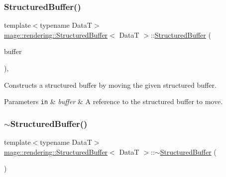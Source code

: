 \subsubsection{\texorpdfstring{Structured\+Buffer()}{StructuredBuffer()}\hspace{0.1cm}{\footnotesize\ttfamily [3/3]}}
{\footnotesize\ttfamily template$<$typename DataT$>$ \\
\hyperlink{classmage_1_1rendering_1_1_structured_buffer}{mage\+::rendering\+::\+Structured\+Buffer}$<$ DataT $>$\+::\hyperlink{classmage_1_1rendering_1_1_structured_buffer}{Structured\+Buffer} (\begin{DoxyParamCaption}\item[{\hyperlink{classmage_1_1rendering_1_1_structured_buffer}{Structured\+Buffer}$<$ DataT $>$ \&\&}]{buffer }\end{DoxyParamCaption})\hspace{0.3cm}{\ttfamily [default]}, {\ttfamily [noexcept]}}

Constructs a structured buffer by moving the given structured buffer.


\begin{DoxyParams}[1]{Parameters}
\mbox{\tt in}  & {\em buffer} & A reference to the structured buffer to move. \\
\hline
\end{DoxyParams}
\hypertarget{classmage_1_1rendering_1_1_structured_buffer_a6c2ccb0efe7157e94f841981be71b6c7}{}\label{classmage_1_1rendering_1_1_structured_buffer_a6c2ccb0efe7157e94f841981be71b6c7} 
\subsubsection{\texorpdfstring{$\sim$\+Structured\+Buffer()}{~StructuredBuffer()}}
{\footnotesize\ttfamily template$<$typename DataT$>$ \\
\hyperlink{classmage_1_1rendering_1_1_structured_buffer}{mage\+::rendering\+::\+Structured\+Buffer}$<$ DataT $>$\+::$\sim$\hyperlink{classmage_1_1rendering_1_1_structured_buffer}{Structured\+Buffer} (\begin{DoxyParamCaption}{ }\end{DoxyParamCaption})\hspace{0.3cm}{\ttfamily [default]}}

